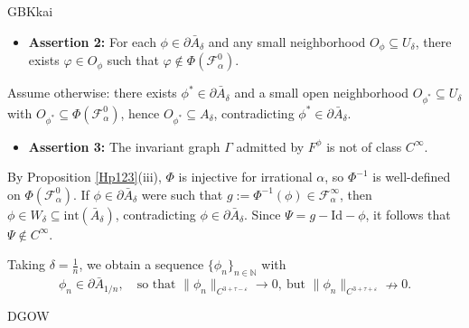 \documentclass{amsart}
\newcommand{\al}{\alpha}
\newcommand{\eps}{\varepsilon}
\theoremstyle{definition}
\begin{document}
\begin{CJK*}{GBK}{kai}
		\begin{itemize}
			\item \textbf{Assertion 2:} For each \( \phi \in \partial\bar{A}_\delta \) and any small neighborhood \( O_\phi \subseteq U_\delta \), there exists \( \varphi \in O_\phi \) such that \( \varphi \notin \Phi(\mathcal{F}_\al^0) \).
		\end{itemize}
		Assume otherwise: there exists \( \phi^* \in \partial\bar{A}_\delta \) and a small open neighborhood \( O_{\phi^*} \subseteq U_\delta \) with \( O_{\phi^*} \subseteq \Phi(\mathcal{F}_\al^0) \), hence \( O_{\phi^*} \subseteq A_\delta \), contradicting \( \phi^* \in \partial\bar{A}_\delta \).
		
		\begin{itemize}
			\item \textbf{Assertion 3:} The invariant graph \( {\Gamma} \) admitted by $F^\phi$ is not of class \( C^\infty \).
		\end{itemize}
		By Proposition \ref{Hp123}(iii), \( \Phi \) is injective for irrational \( \alpha \), so \( \Phi^{-1} \) is well-defined on \( \Phi(\mathcal{F}_\al^0) \). If \( \phi \in \partial\bar{A}_\delta \) were such that \( g := \Phi^{-1}(\phi) \in \mathcal{F}_\al^\infty \), then \( \phi \in W_\delta \subseteq \mathrm{int}(\bar{A}_\delta) \), contradicting \( \phi \in \partial\bar{A}_\delta \). Since \( {\Psi} = g - \mathrm{Id} - \phi \), it follows that \( {\Psi}\notin C^\infty \).
		
		\vspace{1ex}
		
		Taking \( \delta = \frac{1}{n} \), we obtain a sequence \( \{\phi_n\}_{n \in \mathbb{N}} \) with
		\[
		\phi_n \in \partial\bar{A}_{1/n}, \quad \text{so that } \|\phi_n\|_{C^{3+\tau-\varepsilon}} \to 0,\ \text{but } \|\phi_n\|_{C^{3+\tau+\eps}} \nrightarrow 0.
		\]
		
		
		\vspace{2em}
		
		
		
		
		
		
		\medskip
		
		\begin{thebibliography}{DGOW}
			\renewcommand{\baselinestretch}{1.0}
			\setlength\itemsep{-1pt}
			\small
			
			

\end{thebibliography}
\end{CJK*}
\end{document}

